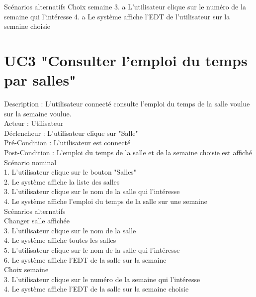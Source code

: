 \documentclass[12pt,a4paper]{article}
\begin{document}
Scénarios alternatifs
Choix semaine
3. a L'utilisateur clique sur le numéro de la semaine qui l'intéresse
4. a Le système affiche l'EDT de l'utilisateur sur la semaine choisie

\section{UC3 "Consulter l'emploi du temps par salles"}
Description : L'utilisateur connecté consulte l'emploi du temps de la salle voulue sur la semaine voulue.\\
Acteur : Utilisateur \\
Déclencheur : L'utilisateur clique sur "Salle"\\
Pré-Condition : L'utilisateur est connecté\\
Post-Condition : L'emploi du temps de la salle et de la semaine choisie est affiché
\\

Scénario nominal\\
1. L'utilisateur clique sur le bouton "Salles"\\
2. Le système affiche la liste des salles\\
3. L'utilisateur clique sur le nom de la salle qui l'intéresse\\
4. Le système affiche l'emploi du temps de la salle sur une semaine\\

Scénarios alternatifs\\
Changer salle affichée\\
3. L'utilisateur clique sur le nom de la salle\\
4. Le système affiche toutes les salles\\
5. L'utilisateur clique sur le nom de la salle qui l'intéresse\\
6. Le système affiche l'EDT de la salle sur la semaine\\

Choix semaine\\
3. L'utilisateur clique sur le numéro de la semaine qui l'intéresse\\
4. Le système affiche l'EDT de la salle sur la semaine choisie\\
\end{document}
